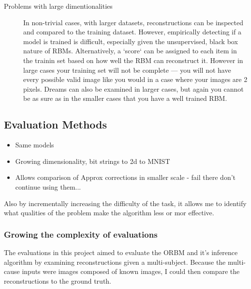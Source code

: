 \begin{description}
  \item[Problems  with large dimentionalities] In non-trivial cases, with larger datasets, reconstructions can be inspected and compared to the training dataset. However, empirically detecting if a model is trained is difficult, especially given the unsupervised, black box nature of RBMs.
  Alternatively, a `score` can be assigned to each item in the trainin set based on how well the RBM can reconstruct it. However in large cases your training set will not be complete --- you will not have every possible valid image like you would in a case where your images are 2 pixels.
  Dreams can also be examined in larger cases, but again you cannot be as sure as in the smaller cases that you have a well trained RBM.

\end{description}

\subsection{Evaluation Methods}

\begin{itemize}
  \item Same models
  \item Growing dimensionality, bit strings to 2d to MNIST
  \item Allows comparison of Approx corrections in smaller scale - fail there don't continue using them...
\end{itemize}

 Also by incrementally increasing the difficulty of the task, it allows me to identify what qualities of the problem make the algorithm less or mor effective.

\subsubsection{Growing the complexity of evaluations}

The evaluations in this project aimed to evaluate the ORBM and it's inference algorithm by examining reconstructions given a multi-subject. Because the multi-cause inputs were images composed of known images, I could then compare the reconstructions to the ground truth.

